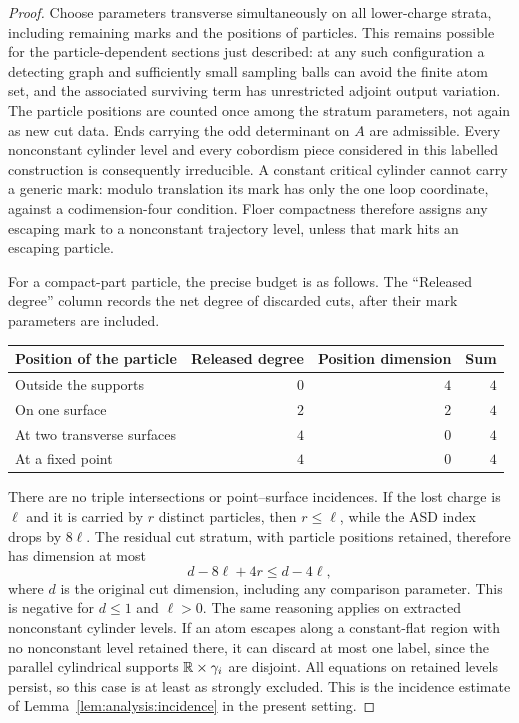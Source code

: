\begin{proof}
Choose parameters transverse simultaneously on all lower-charge strata,
including remaining marks and the positions of particles.  This remains
possible for the particle-dependent sections just described: at any
such configuration a detecting graph and sufficiently small sampling
balls can avoid the finite atom set, and the associated surviving term
has unrestricted adjoint output variation.  The particle positions are
counted once among the stratum parameters, not again as new cut data.
Ends carrying
the odd determinant on $A$ are admissible.  Every nonconstant cylinder
level and every cobordism piece considered in this labelled construction
is consequently irreducible.  A constant critical cylinder cannot carry
a generic mark: modulo translation its mark has only the one loop
coordinate, against a codimension-four condition.  Floer compactness
therefore assigns any escaping mark to a nonconstant trajectory level,
unless that mark hits an escaping particle.

For a compact-part particle, the precise budget is as follows.  The
``Released degree'' column records the net degree of discarded cuts, after their
mark parameters are included.
\begin{center}
\begin{tabular}{lrrr}
\toprule
Position of the particle & Released degree & Position dimension & Sum\\
\midrule
Outside the supports & $0$ & $4$ & $4$\\
On one surface & $2$ & $2$ & $4$\\
At two transverse surfaces & $4$ & $0$ & $4$\\
At a fixed point & $4$ & $0$ & $4$\\
\bottomrule
\end{tabular}
\end{center}
There are no triple intersections or point--surface incidences.  If the
lost charge is $\ell$ and it is carried by $r$ distinct particles, then
$r\le\ell$, while the ASD index drops by $8\ell$.  The residual cut
stratum, with particle positions retained, therefore has dimension at
most
\begin{equation}\label{eq:caps:bubble-budget}
                d-8\ell+4r\le d-4\ell,
\end{equation}
where $d$ is the original cut dimension, including any comparison
parameter.  This is negative for $d\le1$ and $\ell>0$.
The same reasoning applies on extracted nonconstant cylinder levels.
If an atom escapes along a constant-flat region with no nonconstant
level retained there, it can discard at most one label, since the
parallel cylindrical supports $\mathbb R\times\gamma_i$ are disjoint.
All equations on retained levels persist, so this case is at least as
strongly excluded.  This is the incidence estimate of
Lemma~\ref{lem:analysis:incidence} in the present setting.


\end{proof}
